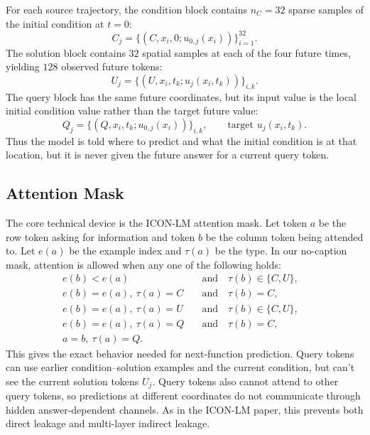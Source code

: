 \documentclass[11pt]{article}
\begin{document}
For each source trajectory, the condition block contains $n_C=32$ sparse samples
of the initial condition at $t=0$:
\begin{equation}
C_j = \{(C,x_i,0;u_{0,j}(x_i))\}_{i=1}^{32}.
\end{equation}
The solution block contains $32$ spatial samples at each of the four future times,
yielding $128$ observed future tokens:
\begin{equation}
U_j = \{(U,x_i,t_k;u_j(x_i,t_k))\}_{i,k}.
\end{equation}
The query block has the same future coordinates, but its input value is the local
initial condition value rather than the target future value:
\begin{equation}
Q_j = \{(Q,x_i,t_k;u_{0,j}(x_i))\}_{i,k},
\qquad
\text{target } u_j(x_i,t_k).
\end{equation}
Thus the model is told where to predict and what the initial condition is at that
location, but it is never given the future answer for a current query token.

\subsection{Attention Mask}

The core technical device is the ICON-LM attention mask. Let token $a$ be the row
token asking for information and token $b$ be the column token being attended to.
Let $e(a)$ be the example index and $\tau(a)$ be the type. In our no-caption mask,
attention is allowed when any one of the following holds:
\begin{align}
e(b)<e(a) &\quad\text{and}\quad \tau(b)\in\{C,U\}, \\
e(b)=e(a),\ \tau(a)=C &\quad\text{and}\quad \tau(b)=C, \\
e(b)=e(a),\ \tau(a)=U &\quad\text{and}\quad \tau(b)\in\{C,U\}, \\
e(b)=e(a),\ \tau(a)=Q &\quad\text{and}\quad \tau(b)=C, \\
a=b,\ \tau(a)=Q. &&
\end{align}
This gives the exact behavior needed for next-function prediction. Query tokens
can use earlier condition--solution examples and the current condition, but can't
see the current solution tokens $U_j$. Query tokens also cannot attend to other
query tokens, so predictions at different coordinates do not communicate through
hidden answer-dependent channels. As in the ICON-LM paper, this prevents both
direct leakage and multi-layer indirect leakage.
\end{document}
